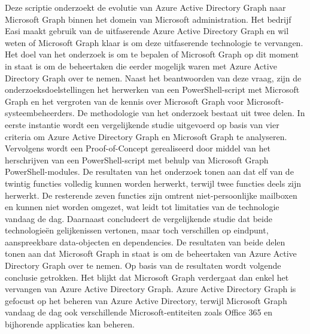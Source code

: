 Deze scriptie onderzoekt de evolutie van Azure Active Directory Graph naar Microsoft Graph binnen het domein van Microsoft administration. Het bedrijf Easi maakt gebruik van de uitfaserende Azure Active Directory Graph en wil weten of Microsoft Graph klaar is om deze uitfaserende technologie te vervangen. Het doel van het onderzoek is om te bepalen of Microsoft Graph op dit moment in staat is om de beheertaken die eerder mogelijk waren met Azure Active Directory Graph over te nemen. Naast het beantwoorden van deze vraag, zijn de onderzoeksdoelstellingen het herwerken van een PowerShell-script met Microsoft Graph en het vergroten van de kennis over Microsoft Graph voor Microsoft-systeembeheerders. De methodologie van het onderzoek bestaat uit twee delen. In eerste instantie wordt een vergelijkende studie uitgevoerd op basis van vier criteria om Azure Active Directory Graph en Microsoft Graph te analyseren. Vervolgens wordt een Proof-of-Concept gerealiseerd door middel van het herschrijven van een PowerShell-script met behulp van Microsoft Graph PowerShell-modules. De resultaten van het onderzoek tonen aan dat elf van de twintig functies volledig kunnen worden herwerkt, terwijl twee functies deels zijn herwerkt. De resterende zeven functies zijn omtrent niet-persoonlijke mailboxen en kunnen niet worden omgezet, wat leidt tot limitaties van de technologie vandaag de dag. Daarnaast concludeert de vergelijkende studie dat beide technologieën gelijkenissen vertonen, maar toch verschillen op eindpunt, aanspreekbare data-objecten en dependencies. De resultaten van beide delen tonen aan dat Microsoft Graph in staat is om de beheertaken van Azure Active Directory Graph over te nemen. Op basis van de resultaten wordt volgende conclusie getrokken. Het blijkt dat Microsoft Graph verdergaat dan enkel het vervangen van Azure Active Directory Graph. Azure Active Directory Graph is gefocust op het beheren van Azure Active Directory, terwijl Microsoft Graph vandaag de dag ook verschillende Microsoft-entiteiten zoals Office 365 en bijhorende applicaties kan beheren. 



